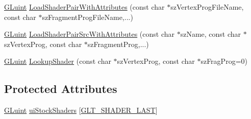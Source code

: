 \begin{DoxyCompactItemize}
\item 
\hyperlink{_g_l_e_w_2glew_8h_a68c4714e43d8e827d80759f9cb864f3c}{G\-Luint} \hyperlink{class_g_l_shader_manager_a202c398bbcdb2df78d0116531f4782ba}{Load\-Shader\-Pair\-With\-Attributes} (const char $\ast$sz\-Vertex\-Prog\-File\-Name, const char $\ast$sz\-Fragment\-Prog\-File\-Name,...)
\item 
\hyperlink{_g_l_e_w_2glew_8h_a68c4714e43d8e827d80759f9cb864f3c}{G\-Luint} \hyperlink{class_g_l_shader_manager_af011b62599dbf202a9ebb5e3a78a412e}{Load\-Shader\-Pair\-Src\-With\-Attributes} (const char $\ast$sz\-Name, const char $\ast$sz\-Vertex\-Prog, const char $\ast$sz\-Fragment\-Prog,...)
\item 
\hyperlink{_g_l_e_w_2glew_8h_a68c4714e43d8e827d80759f9cb864f3c}{G\-Luint} \hyperlink{class_g_l_shader_manager_adaabd638da94fae88a0c7318256ec59d}{Lookup\-Shader} (const char $\ast$sz\-Vertex\-Prog, const char $\ast$sz\-Frag\-Prog=0)
\end{DoxyCompactItemize}
\subsection*{Protected Attributes}
\begin{DoxyCompactItemize}
\item 
\hyperlink{_g_l_e_w_2glew_8h_a68c4714e43d8e827d80759f9cb864f3c}{G\-Luint} \hyperlink{class_g_l_shader_manager_ab290f453e5c0b040dee812b1791b900e}{ui\-Stock\-Shaders} \mbox{[}\hyperlink{_g_l_shader_manager_8h_a3cd026d1a745e792d85349d0093c6266a3dbd0cb0ce70f60087b91ee1d0869a63}{G\-L\-T\-\_\-\-S\-H\-A\-D\-E\-R\-\_\-\-L\-A\-S\-T}\mbox{]}
\end{DoxyCompactItemize}


